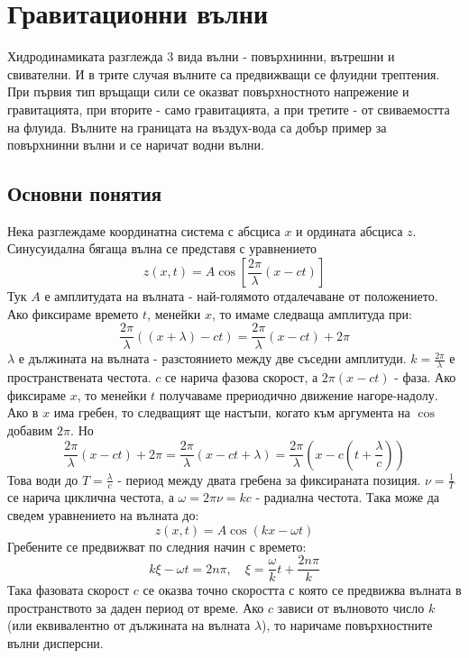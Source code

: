 \setcounter{equation}{0}
\section{Гравитационни вълни}
Хидродинамиката разглежда 3 вида вълни - повърхнинни, вътрешни и свивателни.
И в трите случая вълните са предвижващи се флуидни трептения.
При първия тип връщащи сили се оказват повърхностното напрежение и гравитацията,
при вторите - само гравитацията, а при третите - от свиваемостта на флуида.
Вълните на границата на въздух-вода са добър пример за повърхнинни вълни и се наричат водни вълни.

\subsection{Основни понятия}
Нека разглеждаме координатна система с абсциса $x$ и ордината абсциса $z$.
Синусуидална бягаща вълна се представя с уравнението
\begin{equation}
	z(x,t) = A \cos \left[\frac{2 \pi}{\lambda}(x - c t)\right]
\end{equation}
Тук $A$ е амплитудата на вълната - най-голямото отдалечаване от положението.
Ако фиксираме времето $t$, менейки $x$, то имаме следваща амплитуда при:
\begin{equation*}
	\frac{2 \pi}{\lambda}((x + \lambda) - c t) = \frac{2 \pi}{\lambda}(x - c t) + 2 \pi
\end{equation*}
$\lambda$ е дължината на вълната - разстоянието между две съседни амплитуди.
$k = \frac{2 \pi}{\lambda}$ е пространствената честота.
$c$ се нарича фазова скорост, а $2 \pi (x - c t)$ - фаза.
Ако фиксираме $x$, то менейки $t$ получаваме прериодично движение нагоре-надолу.
Ако в $x$ има гребен, то следващият ще настъпи, когато към аргумента на $\cos$ добавим $2 \pi$.
Но 
\begin{equation*}
	\frac{2 \pi}{\lambda}(x - c t) + 2 \pi = \frac{2 \pi}{\lambda}(x - c t + \lambda) = \frac{2 \pi}{\lambda}(x - c (t + \frac{\lambda}{c}))
\end{equation*}
Това води до $T = \frac{\lambda}{c}$ - период между двата гребена за фиксираната позиция.
$\nu = \frac{1}{T}$ се нарича циклична честота, а $\omega = 2 \pi \nu = k c$ - радиална честота.
Така може да сведем уравнението на вълната до:
\begin{equation}
	z(x,t) = A \cos (k x - \omega t)
\end{equation}
Гребените се предвижват по следния начин с времето:
\begin{equation*}
	k \xi - \omega t = 2 n \pi, \quad \xi = \frac{\omega}{k} t + \frac{2 n \pi}{k} 
\end{equation*}
Така фазовата скорост $c$ се оказва точно скоростта с която се предвижва вълната в пространството за даден период от време. 
Ако $c$ зависи от вълновото число $k$ (или еквивалентно от дължината на вълната $\lambda$), то наричаме повърхностните вълни дисперсни.


